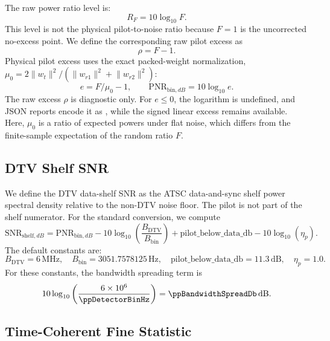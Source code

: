 \documentclass[10pt,letterpaper]{article}
\newcommand{\code}[1]{\texttt{\detokenize{#1}}}
\newcommand{\dB}{\,\mathrm{dB}}
\begin{document}
The raw power ratio level is:
\begin{equation}
  R_F=10\log_{10}F.
\end{equation}
This level is not the physical pilot-to-noise ratio because \(F=1\) is the uncorrected no-excess point. We define the corresponding raw pilot excess as
\begin{equation}
  \boxed{\rho=F-1.}
\end{equation}
Physical pilot excess uses the exact packed-weight normalization,
\(\mu_0=2\lVert w_t\rVert^2/(\lVert w_{r1}\rVert^2+\lVert w_{r2}\rVert^2)\):
\begin{equation}
  e=F/\mu_0-1,\qquad
  \boxed{\mathrm{PNR}_{\mathrm{bin},dB}=10\log_{10}e.}
\end{equation}
The raw excess \(\rho\) is diagnostic only. For \(e\leq0\), the logarithm is
undefined, and JSON reports encode it as \code{null}, while the signed linear
excess remains available. Here, \(\mu_0\) is a ratio of expected powers under
flat noise, which differs from the finite-sample expectation of the random
ratio \(F\).

\subsection{DTV Shelf SNR}

We define the DTV data-shelf SNR as the ATSC data-and-sync shelf power spectral density relative to the non-DTV noise floor. The pilot is not part of the shelf numerator. For the standard conversion, we compute
\begin{equation}
  \boxed{\mathrm{SNR}_{\mathrm{shelf},dB}=
  \mathrm{PNR}_{\mathrm{bin},dB}
  -10\log_{10}\left(\frac{B_{\mathrm{DTV}}}{B_{\mathrm{bin}}}\right)
  +\mathrm{pilot\_below\_data\_db}
  -10\log_{10}(\eta_p).}
\end{equation}
The default constants are:
\begin{equation}
 B_{\mathrm{DTV}}=6\,\mathrm{MHz},\quad
 B_{\mathrm{bin}}=3051.7578125\,\mathrm{Hz},\quad
 \mathrm{pilot\_below\_data\_db}=11.3\dB,
 \quad \eta_p=1.0.
\end{equation}
For these constants, the bandwidth spreading term is
\begin{equation}
  10\log_{10}\left(\frac{6\times 10^6}{\ppDetectorBinHz}\right)=\ppBandwidthSpreadDb\dB.
\end{equation}

\subsection{Time-Coherent Fine Statistic}
\label{ssec:fine}
\end{document}

